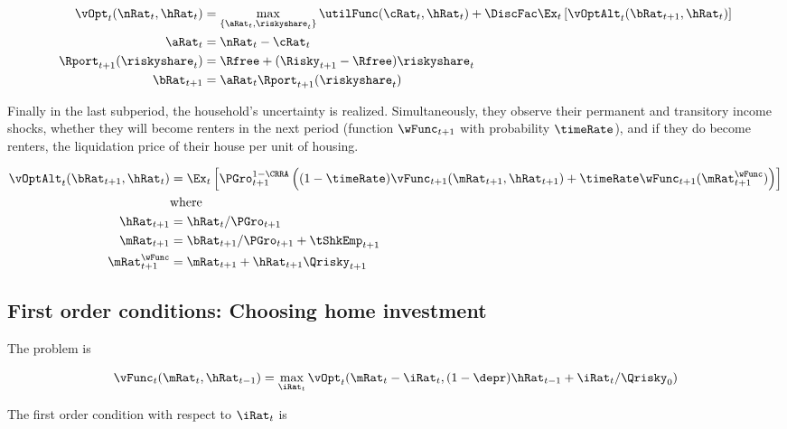 \documentclass[PortfolioChoiceWithRiskyHousing]{subfiles}
\begin{document}
\begin{equation}
	\begin{split}
		\vOpt_{t}(\nRat_{t}, \hRat_{t}) & = \max_{\{\aRat_{t}, \riskyshare_{t}\}} \utilFunc(\cRat_{t}, \hRat_{t}) + \DiscFac \Ex_{t}\left[ \vOptAlt_{t}(\bRat_{t+1}, \hRat_{t}) \right] \\
		\aRat_{t} & = \nRat_{t} - \cRat_{t} \\
		\Rport_{t+1}(\riskyshare_{t}) & = \Rfree + (\Risky_{t+1} - \Rfree)\riskyshare_{t} \\
		\bRat_{t+1} & = \aRat_{t}\Rport_{t+1}(\riskyshare_{t})
	\end{split}
\end{equation}

Finally in the last subperiod, the household's uncertainty is realized. Simultaneously, they observe their permanent and transitory income shocks, whether they will become renters in the next period (function $\wFunc_{t+1}$ with probability $\timeRate$), and if they do become renters, the liquidation price of their house per unit of housing.

\begin{equation}
	\begin{split}
		\vOptAlt_{t}(\bRat_{t+1}, \hRat_{t}) & = \Ex_{t} \left[ \PGro_{t+1}^{1-\CRRA} \left( (1-\timeRate) \vFunc_{t+1}(\mRat_{t+1}, \hRat_{t+1}) + \timeRate \wFunc_{t+1}(\mRat_{t+1}^{\wFunc}) \right) \right] \\
		& \text{where} \\
		\hRat_{t+1} & = \hRat_{t}/\PGro_{t+1} \\
		\mRat_{t+1} & = \bRat_{t+1}/\PGro_{t+1} + \tShkEmp_{t+1} \\
		\mRat_{t+1}^{\wFunc} & = \mRat_{t+1} + \hRat_{t+1} \Qrisky_{t+1}
	\end{split}
\end{equation}

\subsection{First order conditions: Choosing home investment}

The problem is

\begin{equation}
	\vFunc_{t}(\mRat_{t}, \hRat_{t-1}) = \max_{\iRat_{t}} \vOpt_{t}(\mRat_{t} - \iRat_{t}, (1-\depr)\hRat_{t-1} + \iRat_{t}/\Qrisky_0)
\end{equation}

The first order condition with respect to $\iRat_{t}$ is
\end{document}
